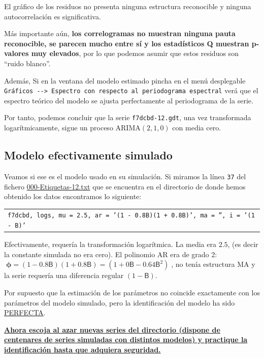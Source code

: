 \documentclass[10pt]{article}
\begin{document}
El gráfico de los residuos no presenta ninguna estructura reconocible y ninguna autocorrelación es significativa. 

Más importante aún, \textbf{los correlogramas no muestran ninguna pauta
reconocible, se parecen mucho entre sí y los estadísticos Q muestran
p-valores muy elevados}, por lo que podemos asumir que estos residuos
son ``ruido blanco''.
\medskip

Además, Si en la ventana del modelo estimado pincha en el menú
desplegable \texttt{Gráficos -{}-{}> Espectro con respecto al periodograma
espectral} verá que el espectro teórico del modelo se ajusta
perfectamente al periodograma de la serie.
\medskip

Por tanto, podemos concluir que la serie \texttt{f7dcbd-12.gdt}, una vez
transformada logarítmicamente, sigue un proceso ARIMA\((2,1,0)\) con
media cero. 
\subsection*{Modelo efectivamente simulado}
\label{sec:org46bf5b0}

Veamos si ese es el modelo usado en su simulación. Si miramos la línea
\texttt{37} del fichero \href{IdentificaEstosARIMA/000-Etiquetas-12.txt}{000-Etiquetas-12.txt} que se encuentra en el directorio de
donde hemos obtenido los datos encontramos lo siguiente:
\medskip

\begin{center}
\begin{tabular}{l}
\texttt{f7dcbd,	logs,	mu = 2.5,	ar = '(1 - 0.8B)(1 + 0.8B)', ma = '', i = '(1 - B)'}\\
\end{tabular}
\end{center}

\medskip

Efectivamente, requería la transformación logarítmica. La media era
\(2.5\), (es decir la constante simulada no era cero). El polinomio AR
era de grado 2: \(\;\boldsymbol{\phi}=(1 - 0.8\mathsf{B})(1 +
0.8\mathsf{B})=(1+0\mathsf{B}-0.64\mathsf{B}^2)\;\), no tenía
estructura MA y la serie requería una diferencia regular \((1 -
\mathsf{B})\).
\bigskip

Por supuesto que la estimación de los parámetros no coincide
exactamente con los parámetros del modelo simulado, pero la
identificación del modelo ha sido \uline{PERFECTA}.
\bigskip


\textbf{\uline{Ahora escoja al azar nuevas series del \href{https://github.com/mbujosab/EconometriaAplicada-SRC/tree/main/Ejercicios/IdentificaEstosARIMA}{directorio} (dispone de
 centenares de series simuladas con distintos modelos) y practique la
 identificación hasta que adquiera seguridad.}}
\end{document}
